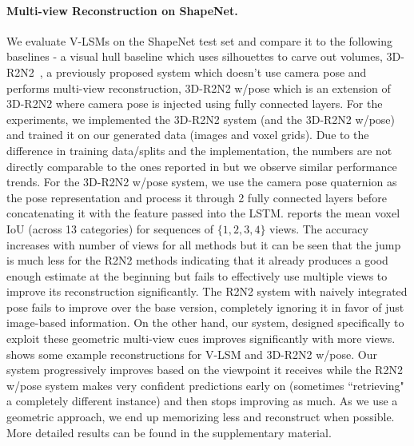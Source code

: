 \documentclass[../thesis.tex]{subfiles}
\begin{document}
\paragraph{Multi-view Reconstruction on ShapeNet.}
We evaluate V-LSMs on the ShapeNet test set and compare it to the following baselines - a visual hull baseline which uses silhouettes to carve out volumes, 3D-R2N2~\cite{choy20163d}, a previously proposed system which doesn't use camera pose and performs multi-view reconstruction, 3D-R2N2 w/pose which is an extension of 3D-R2N2 where camera pose is injected using fully connected layers. For the experiments, we implemented the 3D-R2N2 system (and the 3D-R2N2 w/pose) and trained it on our generated data (images and voxel grids). Due to the difference in training data/splits and the implementation, the numbers are not directly comparable to the ones reported in \cite{choy20163d} but we observe similar performance trends. For the 3D-R2N2 w/pose system, we use the camera pose quaternion as the pose representation and process it through 2 fully connected layers before concatenating it with the feature passed into the LSTM.
 reports the mean voxel IoU (across 13 categories) for sequences of $\{1, 2, 3, 4\}$ views. The accuracy increases with number of views for all methods but it can be seen that the jump is much less for the R2N2 methods indicating that it already produces a good enough estimate at the beginning but fails to effectively use multiple views to improve its reconstruction significantly. The R2N2 system with naively integrated pose fails to improve over the base version, completely ignoring it in favor of just image-based information. On the other hand, our system, designed specifically to exploit these geometric multi-view cues improves significantly with more views.  shows some example reconstructions for V-LSM and 3D-R2N2 w/pose. Our system progressively improves based on the viewpoint it receives while the R2N2 w/pose system makes very confident predictions early on (sometimes ``retrieving" a completely different instance) and then stops improving as much. As we use a geometric approach, we end up memorizing less and reconstruct when possible. More detailed results can be found in the supplementary material.
\end{document}

